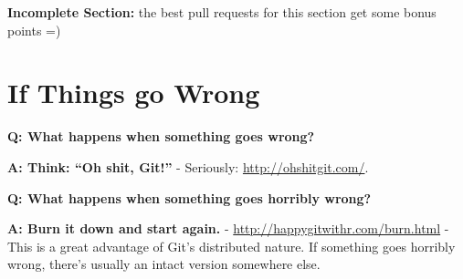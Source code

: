 \documentclass[
]{article}
\begin{document}
\textbf{Incomplete Section:} the best pull requests for this section get
some bonus points =)

\hypertarget{if-things-go-wrong}{%
\section{If Things go Wrong}\label{if-things-go-wrong}}

\textbf{Q: What happens when something goes wrong?}

\textbf{A: Think: ``Oh shit, Git!''} - Seriously:
\url{http://ohshitgit.com/}.

\textbf{Q: What happens when something goes horribly wrong?}

\textbf{A: Burn it down and start again.} -
\url{http://happygitwithr.com/burn.html} - This is a great advantage of
Git's distributed nature. If something goes horribly wrong, there's
usually an intact version somewhere else.
\end{document}
